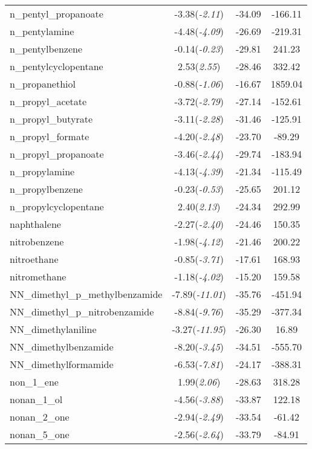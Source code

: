 \documentclass{amsart}
\begin{document}
\begin{center}
\begin{longtable}{l|c|c|c}
n\_pentyl\_propanoate & -3.38(\textit{-2.11}) & -34.09 & -166.11 \\ 
n\_pentylamine & -4.48(\textit{-4.09}) & -26.69 & -219.31 \\ 
n\_pentylbenzene & -0.14(\textit{-0.23}) & -29.81 & 241.23 \\ 
n\_pentylcyclopentane & 2.53(\textit{2.55}) & -28.46 & 332.42 \\ 
n\_propanethiol & -0.88(\textit{-1.06}) & -16.67 & 1859.04 \\ 
n\_propyl\_acetate & -3.72(\textit{-2.79}) & -27.14 & -152.61 \\ 
n\_propyl\_butyrate & -3.11(\textit{-2.28}) & -31.46 & -125.91 \\ 
n\_propyl\_formate & -4.20(\textit{-2.48}) & -23.70 & -89.29 \\ 
n\_propyl\_propanoate & -3.46(\textit{-2.44}) & -29.74 & -183.94 \\ 
n\_propylamine & -4.13(\textit{-4.39}) & -21.34 & -115.49 \\ 
n\_propylbenzene & -0.23(\textit{-0.53}) & -25.65 & 201.12 \\ 
n\_propylcyclopentane & 2.40(\textit{2.13}) & -24.34 & 292.99 \\ 
naphthalene & -2.27(\textit{-2.40}) & -24.46 & 150.35 \\ 
nitrobenzene & -1.98(\textit{-4.12}) & -21.46 & 200.22 \\ 
nitroethane & -0.85(\textit{-3.71}) & -17.61 & 168.93 \\ 
nitromethane & -1.18(\textit{-4.02}) & -15.20 & 159.58 \\ 
NN\_dimethyl\_p\_methylbenzamide & -7.89(\textit{-11.01}) & -35.76 & -451.94 \\ 
NN\_dimethyl\_p\_nitrobenzamide & -8.84(\textit{-9.76}) & -35.29 & -377.34 \\ 
NN\_dimethylaniline & -3.27(\textit{-11.95}) & -26.30 & 16.89 \\ 
NN\_dimethylbenzamide & -8.20(\textit{-3.45}) & -34.51 & -555.70 \\ 
NN\_dimethylformamide & -6.53(\textit{-7.81}) & -24.17 & -388.31 \\ 
non\_1\_ene & 1.99(\textit{2.06}) & -28.63 & 318.28 \\ 
nonan\_1\_ol & -4.56(\textit{-3.88}) & -33.87 & 122.18 \\ 
nonan\_2\_one & -2.94(\textit{-2.49}) & -33.54 & -61.42 \\ 
nonan\_5\_one & -2.56(\textit{-2.64}) & -33.79 & -84.91 \\ 

\end{longtable}
\end{center}
\end{document}
